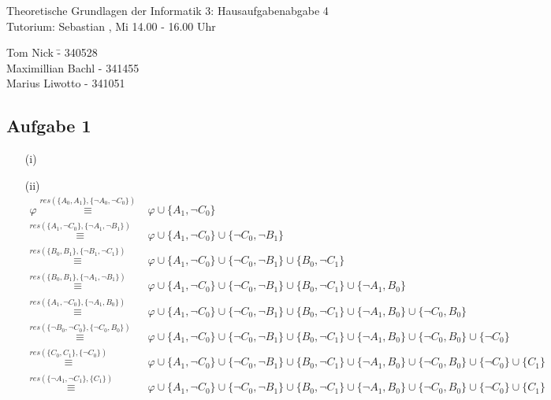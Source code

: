 \documentclass[a4paper,10pt]{article}
\begin{document}
\begin{center}
\Large{Theoretische Grundlagen der Informatik 3: Hausaufgabenabgabe 4} \\
\large{Tutorium: Sebastian , Mi 14.00 - 16.00 Uhr}
\end{center}
\begin{tabbing}
Tom Nick \hspace{2cm}\= - 340528\\
Maximillian Bachl \> - 341455 \\
Marius Liwotto\> -  341051
\end{tabbing}
	\subsection*{Aufgabe 1}
	\begin{enumerate}
	\item[(i)]
	\item[(ii)]
	\begin{align*}
		\varphi \overset{res(\{ A_0,A_1\},\{ \neg A_0,\neg C_0\})}{\equiv} &\varphi \cup \{ A_1,\neg C_0 \} \\
		\overset{res(\{ A_1,\neg C_0 \},\{ \neg A_1,\neg B_1\})}{\equiv} &\varphi \cup \{ A_1,\neg C_0 \} \cup \{ \neg C_0, \neg B_1\}\\
		\overset{res(\{ B_0, B_1 \},\{ \neg B_1,\neg C_1\})}{\equiv} &\varphi \cup \{ A_1,\neg C_0 \} \cup \{ \neg C_0, \neg B_1\} \cup \{ B_0, \neg C_1\}\\
		\overset{res(\{ B_0, B_1 \},\{ \neg A_1,\neg B_1\})}{\equiv} &\varphi \cup \{ A_1,\neg C_0 \} \cup \{ \neg C_0, \neg B_1\} \cup \{ B_0, \neg C_1\} \cup \{\neg A_1, B_0\}\\
		\overset{res(\{ A_1,\neg C_0 \},\{\neg A_1, B_0\})}{\equiv} &\varphi \cup \{ A_1,\neg C_0 \} \cup \{ \neg C_0, \neg B_1\} \cup \{ B_0, \neg C_1\} \cup \{\neg A_1, B_0\} \cup \{\neg C_0, B_0 \}\\
		\overset{res(\{ \neg B_0,\neg C_0 \},\{\neg C_0, B_0\})}{\equiv} &\varphi \cup \{ A_1,\neg C_0 \} \cup \{ \neg C_0, \neg B_1\} \cup \{ B_0, \neg C_1\} \cup \{\neg A_1, B_0\} \cup \{\neg C_0, B_0 \} \cup \{\neg C_0\}\\
		\overset{res(\{ C_0, C_1 \},\{\neg C_0\})}{\equiv} &\varphi \cup \{ A_1,\neg C_0 \} \cup \{ \neg C_0, \neg B_1\} \cup \{ B_0, \neg C_1\} \cup \{\neg A_1, B_0\} \cup \{\neg C_0, B_0 \} \cup \{\neg C_0\} \cup \{C_1\}\\
		\overset{res(\{ \neg A_1, \neg C_1 \},\{C_1\})}{\equiv} &\varphi \cup \{ A_1,\neg C_0 \} \cup \{ \neg C_0, \neg B_1\} \cup \{ B_0, \neg C_1\} \cup \{\neg A_1, B_0\} \cup \{\neg C_0, B_0 \} \cup \{\neg C_0\} \cup \{C_1\} \\

\end{align*}
\end{enumerate}
\end{document}
